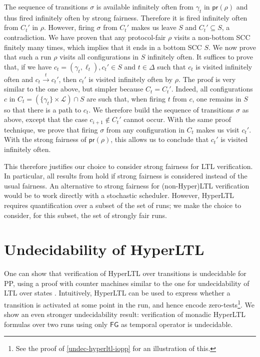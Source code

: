 \documentclass[10pt,a4paper]{article}
\newcommand{\set}[1]{\{#1\}}
\newcommand{\config}{\gamma}
\newcommand{\step}[1]{\xrightarrow{#1}}
\newcommand{\run}{\rho}
\newcommand{\transitions}{\Delta}
\newcommand{\bstates}{\mathcal{L}}
\newcommand*{\abuchistate}{\ell}
\newcommand*{\bstate}{\abuchistate}
\newcommand{\ltlglobally}{\mathsf{G}}
\newcommand{\ltlfinally}{\mathsf{F}}
\newcommand{\protproj}[1]{\mathsf{pr}(#1)}
\newcommand{\configout}{\config_t}
\newcommand{\bstateout}{\bstate_t}
\newcommand{\Cout}{C_t}
\newcommand{\prodout}{c_t}
\begin{document}
\begin{appendixproof}
	The sequence of transitions \(\sigma\) is available infinitely often from \(\configout\) in \(\protproj{\run}\) and thus fired infinitely often by strong fairness.
	Therefore it is fired infinitely often from \(\Cout'\) in \(\run\).
	However, firing \(\sigma\) from \(\Cout'\) makes us leave \(S\) and \(\Cout' \subseteq S\), a contradiction.
	We have proven that any protocol-fair \(\run\) visits a non-bottom SCC finitely many times, which implies that it ends in a bottom SCC \(S\).
	We now prove that such a run \(\run\) visits all configurations in \(S\) infinitely often.
	It suffices to prove that, if we have \(\prodout = (\configout, \bstateout),\prodout' \in S\) and \(t \in \transitions\) such that \(\prodout\) is visited infinitely often and \(\prodout \step{t} \prodout'\), then \(\prodout'\) is visited infinitely often by \(\run\).
	The proof is very similar to the one above, but simpler because \(\Cout = \Cout'\).
	Indeed, all configurations \(c\) in \(\Cout =(\set{\configout} \times \bstates) \cap S\) are such that, when firing \(t\) from \(c\), one remains in \(S\) so that there is a path to \(\prodout\).
	We therefore build the sequence of transitions \(\sigma\) as above, except that the case \(c_{i+1} \notin \Cout'\) cannot occur.
	With the same proof technique, we prove that firing \(\sigma\) from any configuration in \(\Cout\) makes us visit \(\prodout'\).
	With the strong fairness of \(\protproj{\run}\), this allows us to conclude that \(\prodout'\) is visited infinitely often.
\end{appendixproof}

This therefore justifies our choice to consider strong fairness for LTL verification.
In particular, all results from \cite{EGLM16} hold if strong fairness is considered instead of the usual fairness.
An alternative to strong fairness for (non-Hyper)LTL verification would be to work directly with a stochastic scheduler.
However, HyperLTL requires quantification over a subset of the set of runs; we make the choice to consider, for this subset, the set of strongly fair runs.

%
%

%
%
%
%
%
%
%
\section{Undecidability of HyperLTL}
\label{sec:undecidability}

One can show that verification of HyperLTL over transitions is undecidable for PP, using a proof with counter machines similar to the one for undecidability of LTL over states \cite{EGLM16}.
Intuitively, HyperLTL can be used to express whether a transition is activated at some point in the run, and hence encode zero-tests\footnote{ See the proof of \cref{undec-hyperltl-iopp} for an illustration of this.
}.
We show an even stronger undecidability result: verification of monadic HyperLTL formulas over two runs using only \(\ltlfinally \ltlglobally \) as temporal operator is undecidable.
%
\end{document}
